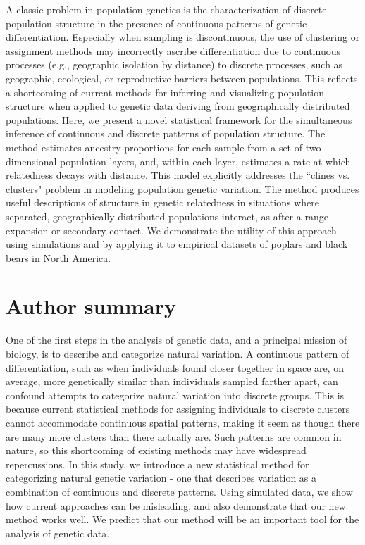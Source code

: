 \documentclass[10pt,letterpaper]{article}
\begin{document}
A classic problem in population genetics is the characterization 
of discrete population structure in the presence of 
continuous patterns of genetic differentiation.
Especially when sampling is discontinuous, 
the use of clustering or assignment methods may incorrectly ascribe
differentiation due to continuous processes (e.g., geographic isolation by distance)
to discrete processes, such as geographic, ecological, or reproductive barriers 
between populations.
This reflects a shortcoming of current methods for inferring and 
visualizing population structure when applied to genetic data
deriving from geographically distributed populations.
Here, we present a novel statistical framework for the simultaneous inference 
of continuous and discrete patterns of population structure.
The method estimates ancestry proportions for each 
sample from a set of two-dimensional population layers, 
and, within each layer, estimates a rate at which relatedness decays with distance.
This model explicitly addresses the ``clines vs. clusters" problem in 
modeling population genetic variation.
The method produces useful descriptions of structure in genetic relatedness
in situations where separated, geographically distributed populations interact,
as after a range expansion or secondary contact.
We demonstrate the utility of this approach using simulations 
and by applying it to empirical datasets of poplars and black bears in North America.

\newpage


\section*{Author summary}
One of the first steps in the analysis of genetic data, 
and a principal mission of biology, 
is to describe and categorize natural variation. 
A continuous pattern of differentiation, 
such as when individuals found closer together in space 
are, on average, more genetically similar than individuals sampled farther apart, 
can confound attempts to categorize natural variation into discrete groups.  
This is because current statistical methods for assigning individuals to discrete clusters 
cannot accommodate continuous spatial patterns, 
making it seem as though there are many more clusters than there actually are. 
Such patterns are common in nature, 
so this shortcoming of existing methods may have widespread repercussions.
In this study, we introduce a new statistical method 
for categorizing natural genetic variation - 
one that describes variation as a combination of continuous and discrete patterns.
Using simulated data, we show how current approaches can be misleading, 
and also demonstrate that our new method works well.  
We predict that our method will be an important tool for the analysis of genetic data.
\end{document}
